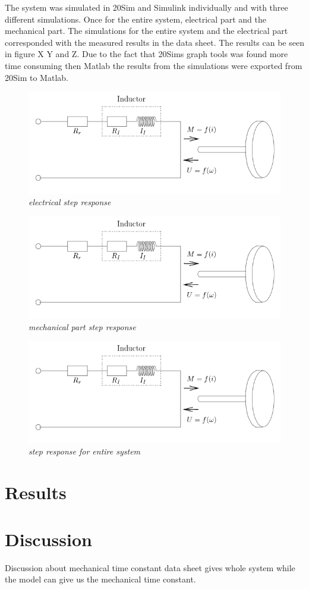 \documentclass[12pt,a4paper]{article}
\begin{document}
The system was simulated in 20Sim and Simulink individually and with three different simulations. Once for the entire system, electrical part and the mechanical part. The simulations for the entire system and the electrical part corresponded with the measured results in the data sheet. The results can be seen in figure X Y and Z. Due to the fact that 20Sims graph tools was found more time consuming then Matlab the results from the simulations were exported from 20Sim to Matlab.
\begin{figure}
  \centering
  \includegraphics[width=.4\linewidth]{schematicdcmotor.png}
  \caption{\emph{electrical step response}}
  \label{fig:electrical}
\end{figure}

\begin{figure}
  \centering
  \includegraphics[width=.4\linewidth]{schematicdcmotor.png}

  \caption{\emph{mechanical part step response}}
  \label{fig:mechanical}
\end{figure}

\begin{figure}
  \centering
  \includegraphics[width=.4\linewidth]{schematicdcmotor.png}
  \caption{\emph{step response for entire system}}
  \label{fig:entire}
\end{figure}


\section{Results}


\section{Discussion}
Discussion about mechanical time constant data sheet gives whole system while the model can give us the mechanical time constant.
\end{document}
